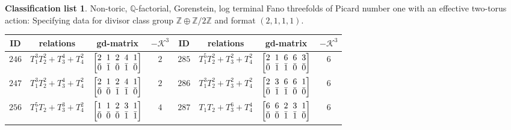 \documentclass[10pt,a4paper]{amsart}
\theoremstyle{definition}
\newtheorem{class-list}[thm]{Classification list}
\def\ZZ{{\mathbb Z}}
\def\QQ{{\mathbb Q}}
\numberwithin{equation}{section}
\begin{document}
\begin{class-list}
Non-toric, $\QQ$-factorial, Gorenstein, log terminal Fano
threefolds of Picard number one with an effective two-torus action:
Specifying data for divisor class group $\ZZ\oplus \ZZ/2\ZZ$ and
format $(2,1,1,1)$.
\begin{table}[h!]\centering\setlength{\tabcolsep}{3.5pt}
\renewcommand{\arraystretch}{1.25}\small\tabulinesep=1mm
\begin{tabu}{c|c|c|c||c|c|c|c}
\hline
ID&relations&gd-matrix&$-\mathcal{K}^3$&ID&relations&gd-matrix&$-\mathcal{K}^3$
\\
\hline
${246}$&${T_{1}^{3}T_{2}^{2}+T_{3}^{4}+T_{4}^{2}}$
&$\arraycolsep=1mm\begin{bmatrix}{2} & {1} & {2} & {4} & {1} \\ {\bar{0}} & {\bar{1}} & {\bar{0}} & {\bar{1}} & {\bar{0}}\end{bmatrix}$&${2}$
&${285}$&${T_{1}^{5}T_{2}^{2}+T_{3}^{2}+T_{4}^{2}}$
&$\arraycolsep=1mm\begin{bmatrix}{2} & {1} & {6} & {6} & {3} \\ {\bar{0}} & {\bar{1}} & {\bar{1}} & {\bar{0}} & {\bar{0}}\end{bmatrix}$&${6}$
\\
\hline
${247}$&${T_{1}^{3}T_{2}^{2}+T_{3}^{4}+T_{4}^{2}}$
&$\arraycolsep=1mm\begin{bmatrix}{2} & {1} & {2} & {4} & {1} \\ {\bar{0}} & {\bar{0}} & {\bar{1}} & {\bar{1}} & {\bar{0}}\end{bmatrix}$&${2}$
&${286}$&${T_{1}^{3}T_{2}^{2}+T_{3}^{2}+T_{4}^{2}}$
&$\arraycolsep=1mm\begin{bmatrix}{2} & {3} & {6} & {6} & {1} \\ {\bar{0}} & {\bar{1}} & {\bar{1}} & {\bar{0}} & {\bar{0}}\end{bmatrix}$&${6}$
\\
\hline
${256}$&${T_{1}^{5}T_{2}+T_{3}^{3}+T_{4}^{2}}$
&$\arraycolsep=1mm\begin{bmatrix}{1} & {1} & {2} & {3} & {1} \\ {\bar{0}} & {\bar{0}} & {\bar{0}} & {\bar{1}} & {\bar{1}}\end{bmatrix}$&${4}$
&${287}$&${T_{1}T_{2}+T_{3}^{6}+T_{4}^{4}}$
&$\arraycolsep=1mm\begin{bmatrix}{6} & {6} & {2} & {3} & {1} \\ {\bar{0}} & {\bar{0}} & {\bar{1}} & {\bar{1}} & {\bar{0}}\end{bmatrix}$&${6}$

\end{tabu}
\end{table}
\end{class-list}
\end{document}
